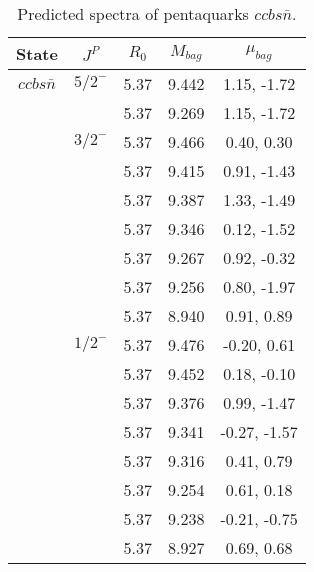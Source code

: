 \documentclass[prd,twocolumn,floatfix,nofootinbib]{revtex4}
\begin{document}
\renewcommand{\tabcolsep}{0.5cm}
\renewcommand{\arraystretch}{1.2}
\begin{table*}[!htbp]
    \caption{Predicted spectra of pentaquarks $ccbs\bar{n}$.}
    \begin{tabular}{ccccc}
        \hline\hline
        {\rm State} &$J^{P}$ &$R_{0}$ &$M_{bag}$ &$\mu_{bag}$ \\ \hline
        ${ccbs\bar{n}}$
            &${5/2}^{-}$    &5.37   &9.442  &1.15, -1.72 \\
            &               &5.37   &9.269  &1.15, -1.72 \\
            &${3/2}^{-}$    &5.37   &9.466  &0.40, 0.30 \\
            &               &5.37   &9.415  &0.91, -1.43 \\
            &               &5.37   &9.387  &1.33, -1.49 \\
            &               &5.37   &9.346  &0.12, -1.52 \\
            &               &5.37   &9.267  &0.92, -0.32 \\
            &               &5.37   &9.256  &0.80, -1.97 \\
            &               &5.37   &8.940  &0.91, 0.89 \\
            &${1/2}^{-}$    &5.37   &9.476  &-0.20, 0.61 \\
            &               &5.37   &9.452  &0.18, -0.10 \\
            &               &5.37   &9.376  &0.99, -1.47 \\
            &               &5.37   &9.341  &-0.27, -1.57 \\
            &               &5.37   &9.316  &0.41, 0.79 \\
            &               &5.37   &9.254  &0.61, 0.18 \\
            &               &5.37   &9.238  &-0.21, -0.75 \\
            &               &5.37   &8.927  &0.69, 0.68 \\
        \hline\hline
    \end{tabular}
\end{table*}
\end{document}
